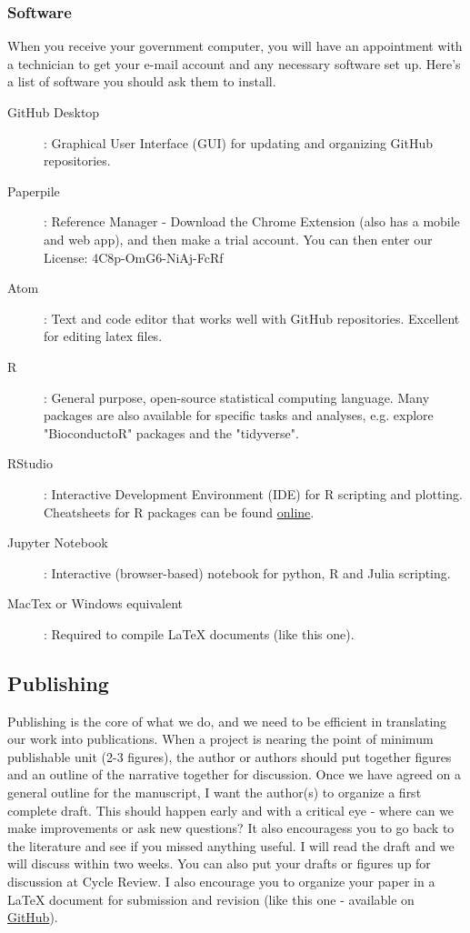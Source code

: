\documentclass[10pt, letterpaper, twocolumn]{article} %
\begin{document}
\subsubsection{Software}
When you receive your government computer, you will have an appointment with a technician to get your e-mail account and any necessary software set up. Here's a list of software you should ask them to install.
\begin{description}
\item [GitHub Desktop]: Graphical User Interface (GUI) for updating and organizing GitHub repositories.
\item [Paperpile]: Reference Manager - Download the Chrome Extension (also has a mobile and web app), and then make a trial account. You can then enter our License: 4C8p-OmG6-NiAj-FcRf
\item [Atom]: Text and code editor that works well with GitHub repositories. Excellent for editing latex files.
\item [R]: General purpose, open-source statistical computing language. Many packages are also available for specific tasks and analyses, e.g. explore "BioconductoR" packages and the "tidyverse".
\item [RStudio]: Interactive Development Environment (IDE) for R scripting and plotting. Cheatsheets for R packages can be found \href{https://www.rstudio.com/resources/cheatsheets/}{online}.
\item [Jupyter Notebook]: Interactive (browser-based) notebook for python, R and Julia scripting.
\item [MacTex or Windows equivalent]: Required to compile LaTeX documents (like this one).
\end{description}

\subsection{Publishing}
Publishing is the core of what we do, and we need to be efficient in translating our work into publications. When a project is nearing the point of minimum publishable unit (2-3 figures), the author or authors should put together figures and an outline of the narrative together for discussion. Once we have agreed on a general outline for the manuscript, I want the author(s) to organize a first complete draft. This should happen early and with a critical eye - where can we make improvements or ask new questions? It also encouragess you to go back to the literature and see if you missed anything useful. I will read the draft and we will discuss within two weeks. You can also put your drafts or figures up for discussion at Cycle Review. I also encourage you to organize your paper in a LaTeX document for submission and revision (like this one - available on \href{https://github.com/QVEU/QVEU/blob/main/ExpectationsDocument/main.tex}{GitHub}).
\end{document}
